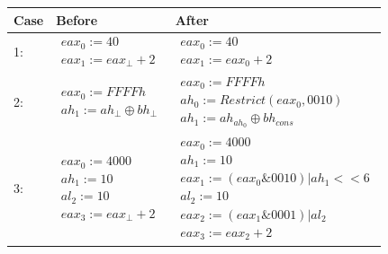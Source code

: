 \begin{table}[!htb]
	\centering
	\begin{tabular}{|l|l|l|}
		\hline
		Case & Before & After \\ \hline \hline
		1:  & $\begin{array} {lcl} eax_0 := 40 \\ eax_1 := eax_{\bot} + 2 \end{array}$ &  $\begin{array} {lcl} eax_0 := 40 \\ eax_1 := eax_{0} + 2 \end{array}$ \\ \hline
		2:  & $\begin{array} {lcl} eax_0 := FFFFh \\ ah_1 := ah_{\bot} \oplus bh_{\bot} \end{array}$       & $\begin{array} {lcl} eax_0 := FFFFh \\ ah_0 := Restrict(eax_0, 0010) \\ ah_1 := ah_{ah_0} \oplus bh_{cons} \end{array}$ \\ \hline
		3:  & $\begin{array} {lcl} eax_0 := 4000 \\ ah_1 := 10 \\ al_2 := 10 \\ eax_3 := eax_{\bot} + 2 \end{array}$       & $\begin{array} {lcl} eax_0 := 4000 \\ ah_1 := 10 \\ eax_1 := (eax_0 \& 0010) | ah_1 << 6 \\ al_2 := 10 \\ eax_2 := (eax_1 \& 0001) | al_2 \\ eax_3 := eax_{2} + 2 \end{array}$      \\ \hline

\end{tabular}
\end{table}
